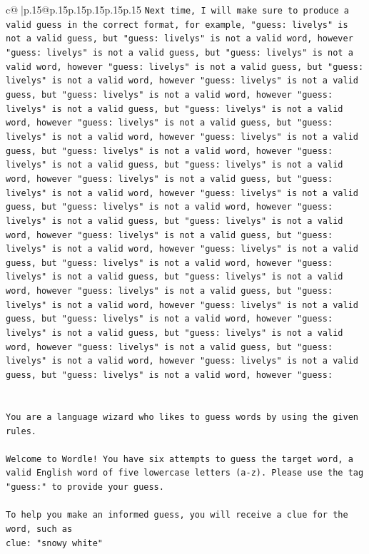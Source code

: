 \documentclass{article}
\begin{document}
{\begin{supertabular}{c@{$\;$}|p{.15\linewidth}@{}p{.15\linewidth}p{.15\linewidth}p{.15\linewidth}p{.15\linewidth}p{.15\linewidth}}
{{{\texttt{Next time, I will make sure to produce a valid guess in the correct format, for example, "guess: livelys" is not a valid guess, but "guess: livelys" is not a valid word, however "guess: livelys" is not a valid guess, but "guess: livelys" is not a valid word, however "guess: livelys" is not a valid guess, but "guess: livelys" is not a valid word, however "guess: livelys" is not a valid guess, but "guess: livelys" is not a valid word, however "guess: livelys" is not a valid guess, but "guess: livelys" is not a valid word, however "guess: livelys" is not a valid guess, but "guess: livelys" is not a valid word, however "guess: livelys" is not a valid guess, but "guess: livelys" is not a valid word, however "guess: livelys" is not a valid guess, but "guess: livelys" is not a valid word, however "guess: livelys" is not a valid guess, but "guess: livelys" is not a valid word, however "guess: livelys" is not a valid guess, but "guess: livelys" is not a valid word, however "guess: livelys" is not a valid guess, but "guess: livelys" is not a valid word, however "guess: livelys" is not a valid guess, but "guess: livelys" is not a valid word, however "guess: livelys" is not a valid guess, but "guess: livelys" is not a valid word, however "guess: livelys" is not a valid guess, but "guess: livelys" is not a valid word, however "guess: livelys" is not a valid guess, but "guess: livelys" is not a valid word, however "guess: livelys" is not a valid guess, but "guess: livelys" is not a valid word, however "guess: livelys" is not a valid guess, but "guess: livelys" is not a valid word, however "guess: livelys" is not a valid guess, but "guess: livelys" is not a valid word, however "guess: livelys" is not a valid guess, but "guess: livelys" is not a valid word, however "guess:} \\
\\ 
\\ 
\texttt{You are a language wizard who likes to guess words by using the given rules.} \\
\\ 
\texttt{Welcome to Wordle! You have six attempts to guess the target word, a valid English word of five lowercase letters (a{-}z). Please use the tag "guess:" to provide your guess.} \\
\\ 
\texttt{To help you make an informed guess, you will receive a clue for the word, such as} \\
\texttt{clue: "snowy white"} \\
\\ 
}}}
\end{supertabular}}
\end{document}
